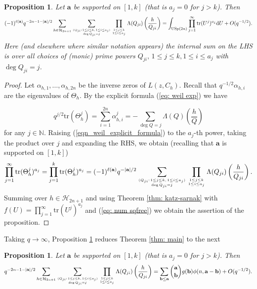 \documentclass[alphabetic, 
        colorlinks,
        linkcolor=red,  citecolor=blue,
        backref
]{amsart}
\numberwithin{equation}{section}
\newtheorem{prop}[claim]{Proposition}
\theoremstyle{definition}
\newcommand{\N}{{\mathbb N}}
\newcommand{\USp}{{\mathrm{USp}}}
\newcommand{\tr}{{\mathrm{tr}}}
\begin{document}
\begin{prop}\label{prop_explicit_formula_means_of_traces} Let $\mathbf a$ be supported on $[1,k]$ (that is $a_j=0$ for $j>k$). Then \begin{multline*}(-1)^{\ell(\mathbf a)}q^{-2n-1-|\mathbf a|/2}\sum_{h\in\mathcal H_{2n+1}}\sum_{(Q_{ji}:\,1\le j\le k,\,1\le i\le a_j)\atop{\deg Q_{ji}=j}}\prod_{1\le j\le k\atop{1\le i\le a_j}}\Lambda(Q_{ji})\left(\frac h{Q_{ji}}\right)=\int_{\USp(2n)}\prod_{j=1}^\infty\tr(U^j)^{a_j}\mathrm d U+O(q^{-1/2}).\end{multline*}
Here (and elsewhere where similar notation appears) the internal sum on the LHS is over all choices of (monic) prime powers $Q_{ji},\,1\le j\le k,1\le i\le a_j$ with $\deg Q_{ji}=j$.
\end{prop}




\begin{proof}
    Let $\alpha_{h,1},\ldots,\alpha_{h,2n}$ be the inverse zeros of $L(z,C_h)$. Recall that $q^{-1/2}\alpha_{h,i}$ are the eigenvalues of $\Theta_h$. By the explicit formula (\ref{eq: weil exp}) we have 

    \begin{equation}\label{eqn_weil_explicit_formula}
    q^{j/2}\tr(\Theta_h^j)=\sum_{i=1}^{2n}\alpha_{h,i}^j=-\sum_{\deg Q=j}\Lambda(Q)\left(\frac hQ\right)   
    \end{equation}
     for any $j\in\N$. Raising (\ref{eqn_weil_explicit_formula}) to the $a_j$-th power, taking the product over $j$ and expanding the RHS, we obtain (recalling that $\mathbf a$ is supported on $[1,k]$)
    $$\prod_{j=1}^\infty\tr(\Theta_h^j)^{a_j}=\prod_{j=1}^k\tr(\Theta_h^j)^{a_j}=(-1)^{\ell(\mathbf a)}q^{-|\mathbf a|/2}\sum_{(Q_{ji}:\,1\le j\le k,\,1\le i\le a_j)\atop{\deg Q_{ji}=j}}\prod_{1\le j\le k\atop{1\le i\le a_j}}\Lambda(Q_{ji})\left(\frac h{Q_{ji}}\right).$$
    Summing over $h\in\mathcal  H_{2n+1}$ and using Theorem \ref{thm: katz-sarnak} with $f(U)=\prod_{j=1}^\infty\tr(U^j)^{a_j}$ and (\ref{eq: num sqfree}) we obtain the assertion of the proposition.
    
\end{proof}

Taking $q\to\infty$, Proposition \ref{prop_explicit_formula_means_of_traces} reduces Theorem \ref{thm: main} to the next

\begin{prop}\label{prop: main}Let $\mathbf a$ be supported on $[1,k]$ (that is $a_j=0$ for $j>k$). Then
\begin{equation}\label{eq: prop main}q^{-2n-1-|\mathbf a|/2}\sum_{h\in\mathcal H_{2n+1}}\sum_{(Q_{ji}:\,1\le j\le k,\,1\le i\le a_j)\atop{\deg Q_{ji}=j}}\prod_{1\le j\le k\atop{1\le i\le a_j}}\Lambda(Q_{ji})\left(\frac h{Q_{ji}}\right)=\sum_{\mathbf b\le\mathbf a}{\mathbf a\choose\mathbf b}g(\mathbf b)\phi(n,\mathbf a-\mathbf b)+O(q^{-1/2}).\end{equation}\end{prop}
\end{document}
